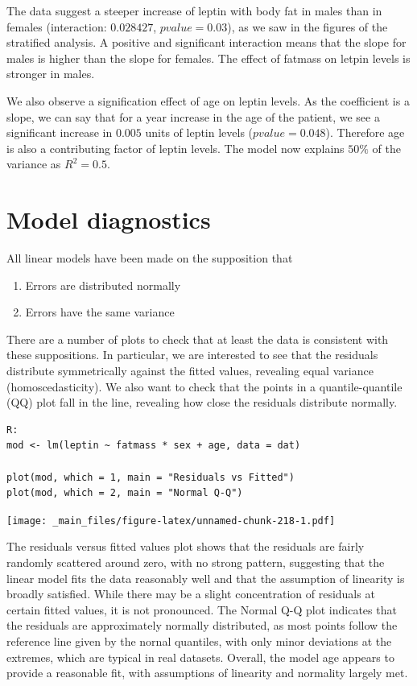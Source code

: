 \documentclass[
]{book}
\begin{document}
The data suggest a steeper increase of leptin with body fat in males than in females (interaction: \(0.028427\), \(pvalue=0.03\)), as we saw in the figures of the stratified analysis. A positive and significant interaction means that the slope for males is higher than the slope for females. The effect of fatmass on letpin levels is stronger in males.

We also observe a signification effect of age on leptin levels. As the coefficient is a slope, we can say that for a year increase in the age of the patient, we see a significant increase in \(0.005\) units of leptin levels (\(pvalue=0.048\)). Therefore age is also a contributing factor of leptin levels. The model now explains \(50\%\) of the variance as \(R^2=0.5\).

\hypertarget{model-diagnostics}{%
\section{Model diagnostics}\label{model-diagnostics}}

All linear models have been made on the supposition that

\begin{enumerate}
\def\labelenumi{\arabic{enumi}.}
\item
  Errors are distributed normally
\item
  Errors have the same variance
\end{enumerate}

There are a number of plots to check that at least the data is consistent with these suppositions. In particular, we are interested to see that the residuals distribute symmetrically against the fitted values, revealing equal variance (homoscedasticity). We also want to check that the points in a quantile-quantile (QQ) plot fall in the line, revealing how close the residuals distribute normally.

\begin{verbatim}
R:
mod <- lm(leptin ~ fatmass * sex + age, data = dat)

plot(mod, which = 1, main = "Residuals vs Fitted")
plot(mod, which = 2, main = "Normal Q-Q")
\end{verbatim}

\texttt{[image: \_main\_files/figure-latex/unnamed-chunk-218-1.pdf]}

The residuals versus fitted values plot shows that the residuals are fairly randomly scattered around zero, with no strong pattern, suggesting that the linear model fits the data reasonably well and that the assumption of linearity is broadly satisfied. While there may be a slight concentration of residuals at certain fitted values, it is not pronounced. The Normal Q-Q plot indicates that the residuals are approximately normally distributed, as most points follow the reference line given by the nornal quantiles, with only minor deviations at the extremes, which are typical in real datasets. Overall, the model age appears to provide a reasonable fit, with assumptions of linearity and normality largely met.
\end{document}
